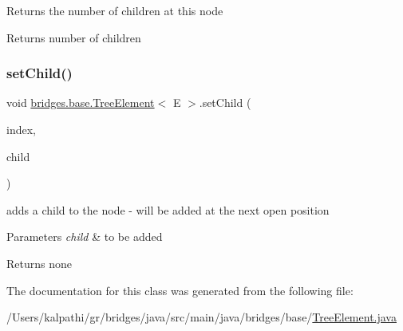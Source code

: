 Returns the number of children at this node

\begin{DoxyReturn}{Returns}
number of children 
\end{DoxyReturn}
\mbox{\label{classbridges_1_1base_1_1_tree_element_aefafebb19d64398d150e464e4361ddf0}} 
\subsubsection{\texorpdfstring{setChild()}{setChild()}}
{\footnotesize\ttfamily void \mbox{\hyperlink{classbridges_1_1base_1_1_tree_element}{bridges.\+base.\+Tree\+Element}}$<$ E $>$.set\+Child (\begin{DoxyParamCaption}\item[{int}]{index,  }\item[{\mbox{\hyperlink{classbridges_1_1base_1_1_tree_element}{Tree\+Element}}$<$ E $>$}]{child }\end{DoxyParamCaption})}

adds a child to the node -\/ will be added at the next open position


\begin{DoxyParams}{Parameters}
{\em child} & to be added\\
\hline
\end{DoxyParams}
\begin{DoxyReturn}{Returns}
none 
\end{DoxyReturn}


The documentation for this class was generated from the following file\+:\begin{DoxyCompactItemize}
\item 
/\+Users/kalpathi/gr/bridges/java/src/main/java/bridges/base/\mbox{\hyperlink{_tree_element_8java}{Tree\+Element.\+java}}\end{DoxyCompactItemize}
